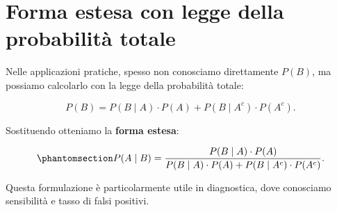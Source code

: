 \documentclass[
  italian,
  letterpaper,
  a4paper,
  11pt,
  open=any]{scrbook}
\theoremstyle{plain}
\theoremstyle{definition}
\theoremstyle{definition}
\theoremstyle{remark}
\begin{document}
\section{Forma estesa con legge della probabilità
totale}\label{sec-bayes-expanded}

Nelle applicazioni pratiche, spesso non conosciamo direttamente
\(P(B)\), ma possiamo calcolarlo con la legge della probabilità totale:

\[
P(B) = P(B \mid A) \cdot P(A) + P(B \mid A^c) \cdot P(A^c).
\]

Sostituendo otteniamo la \textbf{forma estesa}:

\begin{equation}\protect\phantomsection\label{eq-bayes-expanded}{
P(A \mid B) = \frac{P(B \mid A) \cdot P(A)}{P(B \mid A) \cdot P(A) + P(B \mid A^c) \cdot P(A^c)}.
}\end{equation}

Questa formulazione è particolarmente utile in diagnostica, dove
conosciamo sensibilità e tasso di falsi positivi.
\end{document}
